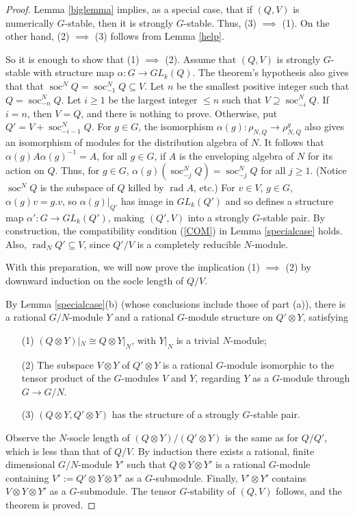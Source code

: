 \documentclass[11pt,leqno,amscd,amssymb,verbatim, url]{amsart}
\theoremstyle{definition}
\numberwithin{equation}{thm}
\newcommand{\soc}{\operatorname{soc}}
\newcommand{\rad}{\operatorname{rad}}
\begin{document}
\begin{proof} Lemma \ref{biglemma} implies, as a special case, that if $(Q,V)$ is numerically $G$-stable, then it is strongly $G$-stable. Thus,
(3) $\implies$ (1). On the other hand, (2) $\implies$ (3) follows from Lemma \ref{help}.

So it is enough to show that (1) $\implies$ (2).
Assume that $(Q,V)$ is strongly $G$-stable with structure map $\alpha:G\to GL_k(Q)$. The theorem's
hypothesis also gives that
that $\soc^NQ=\soc^N_{-1}Q\subseteq V$.  Let $n$ be the smallest positive integer such that $Q=\soc^N_{-n}Q$.
Let $i\geq 1$ be the largest integer $\leq n$ such that $V\supseteq \soc^N_{-i}Q$. If $i=n$, then $V=Q$, and there
is nothing to prove. Otherwise, put $Q'=V+\soc^N_{-i-1}Q$.   For $g\in G$, the isomorphism
$\alpha(g):\rho_{N,Q}\to\rho_{N,Q}^g$ also gives an isomorphism of modules for the distribution
algebra of $N$. It follows that  $\alpha(g)A\alpha(g)^{-1}=A$, for all $g\in G$, if $A$ is the enveloping algebra 
of $N$ for its action on $Q$. Thus, for $g\in G$,  $\alpha(g)(\soc^N_{-j}Q)=\soc^N_{-j}Q$ for all $j\geq 1$. 
(Notice $\soc^NQ$ is the subspace of $Q$ killed by $\rad A$, etc.) For
$v\in V$, $g\in G$, $\alpha(g)v=g.v$, so $\alpha(g)|_{Q'}$ has image in $GL_k(Q')$ and so defines 
a structure map $\alpha':G\to GL_k(Q')$, making $(Q',V)$ into a strongly $G$-stable pair. By construction,
the compatibility condition (\ref{COM}) in Lemma \ref{specialcase} holds. Also, $\rad_NQ'\subseteq V$,
since $Q'/V$ is a completely reducible $N$-module. 

With this preparation, we will now prove the implication (1) $\implies$ (2) by downward induction on
the socle length of $Q/V$.

By Lemma \ref{specialcase}(b) (whose conclusions include those of part (a)), there is a rational $G/N$-module
$Y$ and a rational $G$-module structure on $Q'\otimes Y$, satisfying

\begin{itemize}
\item[(1)] $(Q\otimes Y)|_N\cong Q\otimes Y|_N$, with $Y|_N$ is a trivial $N$-module;
\item[(2)] The subspace $V\otimes Y$ of $Q'\otimes Y$ is a rational $G$-module isomorphic to the tensor product of the $G$-modules $V$ and $Y$, regarding $Y$ as a $G$-module through $G\to G/N$.
\item[(3)] $(Q\otimes Y,Q'\otimes Y)$ has the structure of a strongly $G$-stable pair.
\end{itemize}
Observe the $N$-socle length of $(Q\otimes Y)/(Q'\otimes Y)$ is the same as for $Q/Q'$, which
is less than that of $Q/V$. By induction there exists a rational, finite dimensional $G/N$-module $Y'$
such that $Q\otimes Y\otimes Y'$ is a rational $G$-module containing $V':=Q'\otimes Y\otimes Y'$ as a $G$-submodule. Finally,
$V'\otimes Y'$ contains $V\otimes Y\otimes Y'$ as a $G$-submodule.  The tensor $G$-stability of $(Q,V)$
follows, and the theorem is proved. \end{proof}
\end{document}
